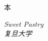     本

    \begin{flushright}
        \textit{Sweet Pastry} \\[1em]
        \textit{复旦大学}
    \end{flushright}